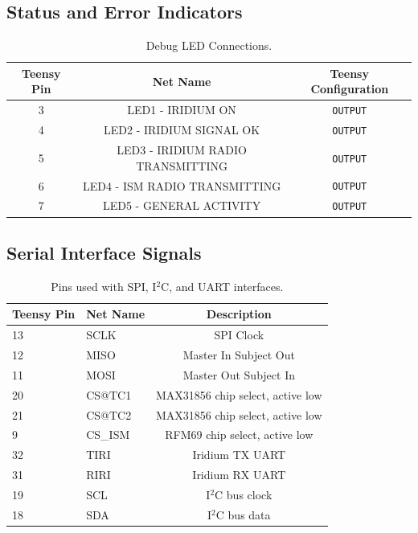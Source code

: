 \documentclass{article}
\begin{document}
\subsection{Status and Error Indicators}
\begin{table}[H]
    \centering
    \begin{tabular}{c|c|c}
    Teensy Pin & Net Name     & Teensy Configuration \\
    \hline 
    3 & LED1 - IRIDIUM ON        &   \texttt{OUTPUT}\\
    4 & LED2 - IRIDIUM SIGNAL OK       &   \texttt{OUTPUT}\\
    5 & LED3 - IRIDIUM RADIO TRANSMITTING       &   \texttt{OUTPUT}\\
    6 & LED4 - ISM RADIO TRANSMITTING       &   \texttt{OUTPUT}\\
    7 & LED5 - GENERAL ACTIVITY       &   \texttt{OUTPUT}
    \end{tabular}
    \caption{Debug LED Connections.}
    \label{tab:pins_leds}
\end{table}

\subsection{Serial Interface Signals}

\begin{table}[H]
    \centering
    \begin{tabular}{l|l|c}
   Teensy Pin & Net Name &  Description \\
    \hline \hline
    
        \hline
    13 & SCLK     &  SPI Clock \\
    12 & MISO     &  Master In Subject Out \\
    11 & MOSI     &  Master Out Subject In \\
    20 & CS@TC1 & MAX31856 chip select, active low \\
    21 & CS@TC2 & MAX31856 chip select, active low  \\
    9 & CS\_ISM     & RFM69 chip select, active low  \\
    \hline
    32 & TIRI     & Iridium TX UART \\
    31 & RIRI      & Iridium RX UART \\
    \hline
    19 & SCL & I$^2$C bus clock \\
    18 & SDA & I$^2$C bus data
    \end{tabular}
    \caption{Pins used with SPI, I$^2$C, and UART interfaces.}
    \label{tab:pins_serial}
\end{table}
\end{document}
